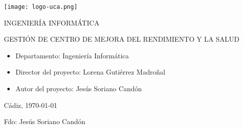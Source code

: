 


\begin{center}

  \texttt{[image: logo-uca.png]} \\

  \vspace{2.5cm}


  \vspace{1.0cm}

  \large{INGENIERÍA INFORMÁTICA} \\

  \vspace{2.0cm}

  \large{GESTIÓN DE CENTRO DE MEJORA DEL RENDIMIENTO Y LA SALUD} \\

  \vspace{2.5cm}

\end{center}

\begin{itemize}
\item \large{Departamento: Ingeniería Informática}
\item \large{Director del proyecto: Lorena Gutiérrez Madroñal}
\item \large{Autor del proyecto: Jesús Soriano Candón}
\end{itemize}

\vspace{0.2cm}

\begin{flushright}
  \large{Cádiz, \today} \\

  \vspace{2.5cm}

  \large{Fdo: Jesús Soriano Candón}
\end{flushright}
